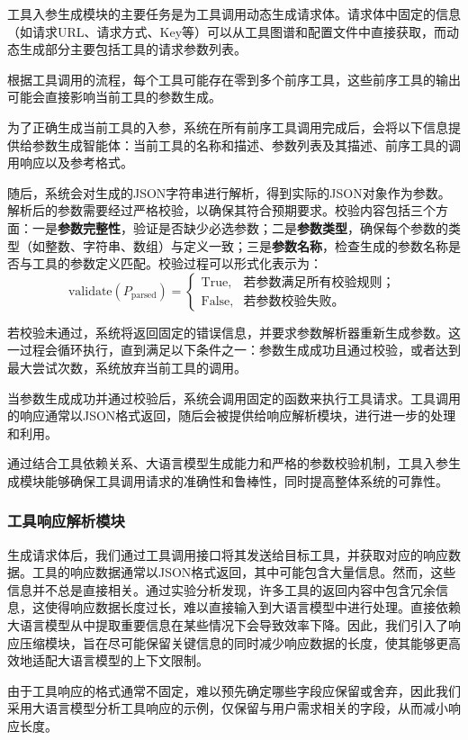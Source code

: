 工具入参生成模块的主要任务是为工具调用动态生成请求体。请求体中固定的信息（如请求URL、请求方式、Key等）可以从工具图谱和配置文件中直接获取，而动态生成部分主要包括工具的请求参数列表。

根据工具调用的流程，每个工具可能存在零到多个前序工具，这些前序工具的输出可能会直接影响当前工具的参数生成。

为了正确生成当前工具的入参，系统在所有前序工具调用完成后，会将以下信息提供给参数生成智能体：当前工具的名称和描述、参数列表及其描述、前序工具的调用响应以及参考格式。

随后，系统会对生成的JSON字符串进行解析，得到实际的JSON对象作为参数。解析后的参数需要经过严格校验，以确保其符合预期要求。校验内容包括三个方面：一是\textbf{参数完整性}，验证是否缺少必选参数；二是\textbf{参数类型}，确保每个参数的类型（如整数、字符串、数组）与定义一致；三是\textbf{参数名称}，检查生成的参数名称是否与工具的参数定义匹配。校验过程可以形式化表示为：
\[
\text{validate}(P_{\text{parsed}}) =
\begin{cases}
\text{True}, & \text{若参数满足所有校验规则；} \\
\text{False}, & \text{若参数校验失败。}
\end{cases}
\]

若校验未通过，系统将返回固定的错误信息，并要求参数解析器重新生成参数。这一过程会循环执行，直到满足以下条件之一：参数生成成功且通过校验，或者达到最大尝试次数，系统放弃当前工具的调用。

当参数生成成功并通过校验后，系统会调用固定的函数来执行工具请求。工具调用的响应通常以JSON格式返回，随后会被提供给响应解析模块，进行进一步的处理和利用。

通过结合工具依赖关系、大语言模型生成能力和严格的参数校验机制，工具入参生成模块能够确保工具调用请求的准确性和鲁棒性，同时提高整体系统的可靠性。

\subsubsection{工具响应解析模块}

生成请求体后，我们通过工具调用接口将其发送给目标工具，并获取对应的响应数据。工具的响应数据通常以JSON格式返回，其中可能包含大量信息。然而，这些信息并不总是直接相关。通过实验分析发现，许多工具的返回内容中包含冗余信息，这使得响应数据长度过长，难以直接输入到大语言模型中进行处理。直接依赖大语言模型从中提取重要信息在某些情况下会导致效率下降。因此，我们引入了响应压缩模块，旨在尽可能保留关键信息的同时减少响应数据的长度，使其能够更高效地适配大语言模型的上下文限制。

由于工具响应的格式通常不固定，难以预先确定哪些字段应保留或舍弃，因此我们采用大语言模型分析工具响应的示例，仅保留与用户需求相关的字段，从而减小响应长度。

